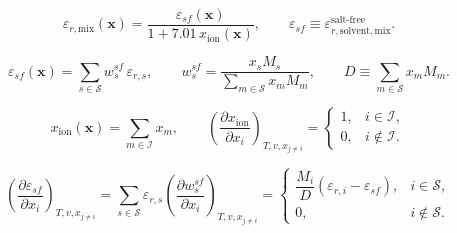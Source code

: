 \documentclass[12pt, letterpaper]{article}
\begin{document}
\begin{equation}
    \varepsilon_{r,\mathrm{mix}}(\mathbf{x})
    =
    \frac{\varepsilon_{sf}(\mathbf{x})}{1+7.01\,x_{\mathrm{ion}}(\mathbf{x})},
    \qquad
    \varepsilon_{sf}\equiv \varepsilon_{r,\mathrm{solvent,mix}}^{\mathrm{salt\text{-}free}} .
    \label{eq:epsr_mix_suppressed}
\end{equation}


\begin{equation}
    \varepsilon_{sf}(\mathbf{x})
    =
    \sum_{s\in\mathcal{S}} w_{s}^{sf}\,\varepsilon_{r,s},
    \qquad
    w_{s}^{sf}
    =
    \frac{x_{s} M_{s}}{\displaystyle \sum_{m\in\mathcal{S}} x_{m} M_{m}},
    \qquad
    D\equiv \sum_{m\in\mathcal{S}} x_{m} M_{m} .
    \label{eq:epsr_sf}
\end{equation}


\begin{equation}
    x_{\mathrm{ion}}(\mathbf{x})=\sum_{m\in\mathcal{I}} x_{m},
    \qquad
    \left(\frac{\partial x_{\mathrm{ion}}}{\partial x_{i}}\right)_{T,v,x_{j\neq i}}
    =
    \begin{cases}
        1, & i\in\mathcal{I},    \\
        0, & i\notin\mathcal{I}.
    \end{cases}
    \label{eq:x_ion_total}
\end{equation}

\begin{equation}
    \left(\frac{\partial \varepsilon_{sf}}{\partial x_{i}}\right)_{T,v,x_{j\neq i}}
    =
    \sum_{s\in\mathcal{S}} \varepsilon_{r,s}
    \left(\frac{\partial w_{s}^{sf}}{\partial x_{i}}\right)_{T,v,x_{j\neq i}}
    =
    \begin{cases}
        \dfrac{M_{i}}{D}\left(\varepsilon_{r,i}-\varepsilon_{sf}\right), & i\in\mathcal{S},    \\[10pt]
        0,                                                             & i\notin\mathcal{S}.
    \end{cases}
    \label{eq:depsr_sf_dxi}
\end{equation}
\end{document}
